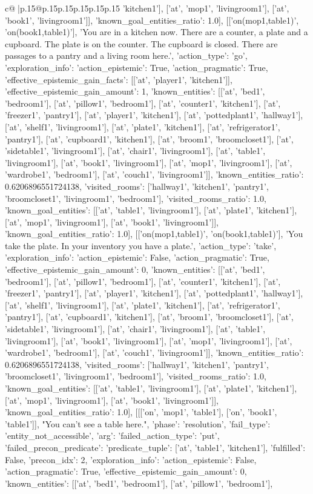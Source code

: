 \documentclass{article}
\begin{document}
{\begin{supertabular}{c@{$\;$}|p{.15\linewidth}@{}p{.15\linewidth}p{.15\linewidth}p{.15\linewidth}p{.15\linewidth}p{.15\linewidth}}
{{{'kitchen1'], ['at', 'mop1', 'livingroom1'], ['at', 'book1', 'livingroom1']], 'known_goal_entities_ratio': 1.0}}], [['on(mop1,table1)', 'on(book1,table1)'], 'You are in a kitchen now. There are a counter, a plate and a cupboard. The plate is on the counter. The cupboard is closed. There are passages to a pantry and a living room here.', {'action_type': 'go', 'exploration_info': {'action_epistemic': True, 'action_pragmatic': True, 'effective_epistemic_gain_facts': [['at', 'player1', 'kitchen1']], 'effective_epistemic_gain_amount': 1, 'known_entities': [['at', 'bed1', 'bedroom1'], ['at', 'pillow1', 'bedroom1'], ['at', 'counter1', 'kitchen1'], ['at', 'freezer1', 'pantry1'], ['at', 'player1', 'kitchen1'], ['at', 'pottedplant1', 'hallway1'], ['at', 'shelf1', 'livingroom1'], ['at', 'plate1', 'kitchen1'], ['at', 'refrigerator1', 'pantry1'], ['at', 'cupboard1', 'kitchen1'], ['at', 'broom1', 'broomcloset1'], ['at', 'sidetable1', 'livingroom1'], ['at', 'chair1', 'livingroom1'], ['at', 'table1', 'livingroom1'], ['at', 'book1', 'livingroom1'], ['at', 'mop1', 'livingroom1'], ['at', 'wardrobe1', 'bedroom1'], ['at', 'couch1', 'livingroom1']], 'known_entities_ratio': 0.6206896551724138, 'visited_rooms': ['hallway1', 'kitchen1', 'pantry1', 'broomcloset1', 'livingroom1', 'bedroom1'], 'visited_rooms_ratio': 1.0, 'known_goal_entities': [['at', 'table1', 'livingroom1'], ['at', 'plate1', 'kitchen1'], ['at', 'mop1', 'livingroom1'], ['at', 'book1', 'livingroom1']], 'known_goal_entities_ratio': 1.0}}], [['on(mop1,table1)', 'on(book1,table1)'], 'You take the plate. In your inventory you have a plate.', {'action_type': 'take', 'exploration_info': {'action_epistemic': False, 'action_pragmatic': True, 'effective_epistemic_gain_amount': 0, 'known_entities': [['at', 'bed1', 'bedroom1'], ['at', 'pillow1', 'bedroom1'], ['at', 'counter1', 'kitchen1'], ['at', 'freezer1', 'pantry1'], ['at', 'player1', 'kitchen1'], ['at', 'pottedplant1', 'hallway1'], ['at', 'shelf1', 'livingroom1'], ['at', 'plate1', 'kitchen1'], ['at', 'refrigerator1', 'pantry1'], ['at', 'cupboard1', 'kitchen1'], ['at', 'broom1', 'broomcloset1'], ['at', 'sidetable1', 'livingroom1'], ['at', 'chair1', 'livingroom1'], ['at', 'table1', 'livingroom1'], ['at', 'book1', 'livingroom1'], ['at', 'mop1', 'livingroom1'], ['at', 'wardrobe1', 'bedroom1'], ['at', 'couch1', 'livingroom1']], 'known_entities_ratio': 0.6206896551724138, 'visited_rooms': ['hallway1', 'kitchen1', 'pantry1', 'broomcloset1', 'livingroom1', 'bedroom1'], 'visited_rooms_ratio': 1.0, 'known_goal_entities': [['at', 'table1', 'livingroom1'], ['at', 'plate1', 'kitchen1'], ['at', 'mop1', 'livingroom1'], ['at', 'book1', 'livingroom1']], 'known_goal_entities_ratio': 1.0}}], [[['on', 'mop1', 'table1'], ['on', 'book1', 'table1']], "You can't see a table here.", {'phase': 'resolution', 'fail_type': 'entity_not_accessible', 'arg': {'failed_action_type': 'put', 'failed_precon_predicate': {'predicate_tuple': ['at', 'table1', 'kitchen1'], 'fulfilled': False, 'precon_idx': 2}}, 'exploration_info': {'action_epistemic': False, 'action_pragmatic': True, 'effective_epistemic_gain_amount': 0, 'known_entities': [['at', 'bed1', 'bedroom1'], ['at', 'pillow1', 'bedroom1'], }}}
\end{supertabular}}
\end{document}
